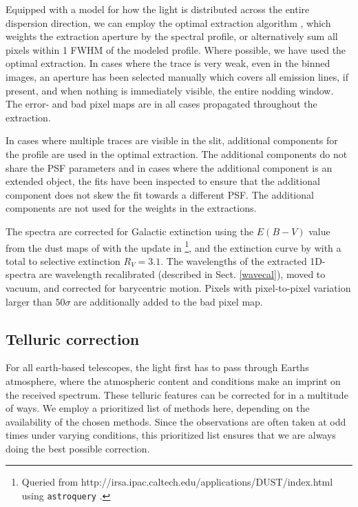 \documentclass{aa}    %
\begin{document}
Equipped with a model for how the light is distributed across the entire
dispersion direction, we can  employ the optimal extraction algorithm
\citep{Horne1986}, which weights the extraction aperture by the spectral profile,
or alternatively sum all pixels within 1 FWHM of the modeled profile. Where
possible, we have used the optimal extraction. In cases where the trace is very
weak, even in the binned images, an aperture has been selected manually which
covers all emission lines, if present, and when nothing is immediately visible, the
entire nodding window. The error- and bad pixel maps are in all cases propagated
throughout the extraction.

In cases where multiple traces are visible in the slit, additional components
for the profile are used in the optimal extraction. The additional components do
not share the PSF parameters and in cases where the additional component is an
extended object, the fits have been inspected to ensure that the additional
component does not skew the fit towards a different PSF. The additional
components are not used for the weights in the extractions.

The spectra are corrected for Galactic extinction using the $E(B-V)$ value from
the dust maps of \citet{Schlegel1998} with the update in
\citet{Schlafly2011}\footnote{Queried from
	http://irsa.ipac.caltech.edu/applications/DUST/index.html using
	\texttt{astroquery} \citep{astroquery}.}, and the extinction curve by
\cite{Cardelli1989} with a total to selective extinction $R_V = 3.1$. The
wavelengths of the extracted 1D-spectra are wavelength recalibrated (described
in Sect. \ref{wavecal}), moved to vacuum, and corrected for barycentric motion.
Pixels with pixel-to-pixel variation larger than $50 \sigma$ are additionally
added to the bad pixel map.


\subsection{Telluric correction} \label{tell_corr}

For all earth-based telescopes, the light first has to pass through Earths
atmosphere, where the atmospheric content and conditions make an imprint on the
received spectrum. These telluric features can be corrected for in a multitude
of ways. We employ a prioritized list of methods here, depending on the
availability of the chosen methods. Since the observations are often taken at
odd times under varying conditions, this prioritized list ensures that we are
always doing the best possible correction.
\end{document}

